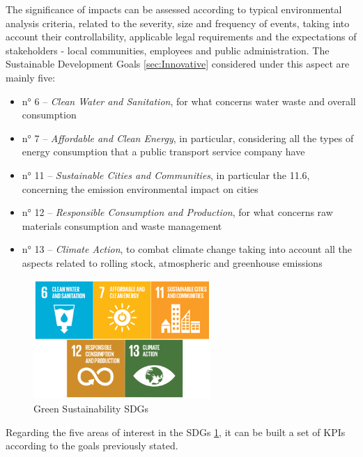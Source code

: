 The significance of impacts can be assessed according to typical environmental analysis criteria, related to the severity, size and frequency of events, taking into account their controllability, applicable legal requirements and the expectations of stakeholders - local communities, employees and public administration. 
The Sustainable Development Goals \ref{sec:Innovative} considered under this aspect are mainly five:
\begin{itemize}
    \item n° 6 – \textit{Clean Water and Sanitation}, for what concerns water waste and overall consumption
    \item n° 7 – \textit{Affordable and Clean Energy}, in particular, considering all the types of energy consumption that a public transport service company have
     \item n° 11 – \textit{Sustainable Cities and Communities}, in particular the 11.6, concerning the emission environmental impact on cities
    \item n° 12 – \textit{Responsible Consumption and Production}, for what concerns raw materials consumption and waste management
    \item n° 13 – \textit{Climate Action}, to combat climate change taking into account all the aspects related to rolling stock, atmospheric and greenhouse emissions
\end{itemize}

\begin{figure}[!ht]
    \centering
    \includegraphics[width=0.6\textwidth]{Images/Green Sustainability/SDGs green.png}
    \caption{Green Sustainability SDGs}
    \label{fig:grsussdg}
\end{figure}

Regarding the five areas of interest in the SDGs \ref{fig:grsussdg}, it can be built a set of KPIs according to the goals previously stated.

